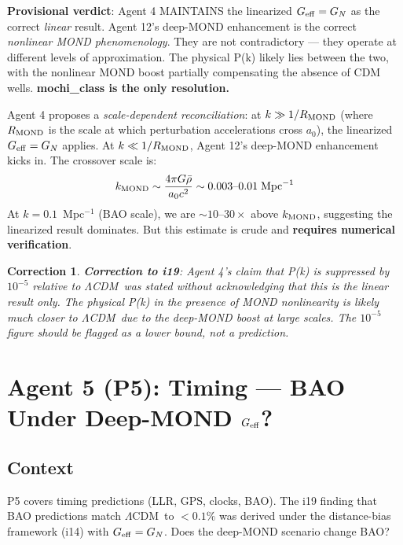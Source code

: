 \documentclass[11pt]{article}
\newcommand{\Geff}{G_{\rm eff}}
\newcommand{\LCDM}{$\Lambda$CDM}
\newcommand{\azero}{a_0}
\newtheorem{correction}[theorem]{Correction}
\theoremstyle{remark}
\begin{document}
\begin{crisisbox}[CRITICAL: The $\Geff$ Position]
\textbf{Provisional verdict}: Agent 4 MAINTAINS the linearized $\Geff = G_N$ as the
correct \emph{linear} result. Agent 12's deep-MOND enhancement is the correct
\emph{nonlinear MOND phenomenology}. They are not contradictory --- they operate at
different levels of approximation. The physical P(k) likely lies between the two,
with the nonlinear MOND boost partially compensating the absence of CDM wells.
\textbf{mochi\_class is the only resolution.}
\end{crisisbox}

\begin{newbox}
Agent 4 proposes a \emph{scale-dependent reconciliation}: at $k \gg 1/R_{\rm MOND}$
(where $R_{\rm MOND}$ is the scale at which perturbation accelerations cross $\azero$),
the linearized $\Geff = G_N$ applies. At $k \ll 1/R_{\rm MOND}$, Agent 12's deep-MOND
enhancement kicks in. The crossover scale is:
\[
  k_{\rm MOND} \sim \frac{4\pi G \bar\rho}{\azero c^2} \sim 0.003 \text{--} 0.01\;\text{Mpc}^{-1}
\]
At $k = 0.1$~Mpc$^{-1}$ (BAO scale), we are $\sim 10$--$30\times$ above $k_{\rm MOND}$,
suggesting the linearized result dominates. But this estimate is crude and
\textbf{requires numerical verification}.
\end{newbox}

\begin{correction}
\textbf{Correction to i19}: Agent 4's claim that P(k) is suppressed by $10^{-5}$ relative
to \LCDM\ was stated without acknowledging that this is the \emph{linear} result only.
The physical P(k) in the presence of MOND nonlinearity is likely much closer to \LCDM\
due to the deep-MOND boost at large scales. The $10^{-5}$ figure should be flagged as
a lower bound, not a prediction.
\end{correction}

\newpage
\section{Agent 5 (P5): Timing --- BAO Under Deep-MOND $\Geff$?}
\label{sec:agent5}

\subsection{Context}
P5 covers timing predictions (LLR, GPS, clocks, BAO). The i19 finding that BAO
predictions match \LCDM\ to $<0.1\%$ was derived under the distance-bias framework
(i14) with $\Geff = G_N$. Does the deep-MOND scenario change BAO?
\end{document}
